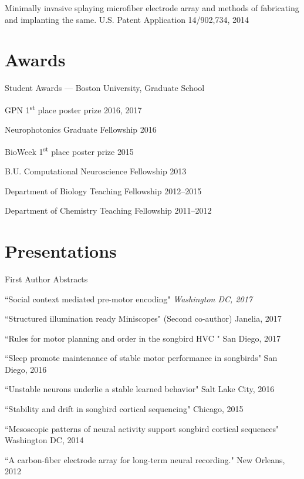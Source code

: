 Minimally invasive splaying microfiber electrode array and methods of fabricating and implanting the same.  U.S. Patent Application 14/902,734, 2014

\section{Awards}
Student Awards --- Boston University, Graduate School
\begin{innerlist}
\item GPN 1\textsuperscript{st} place poster prize \hfill{2016, 2017}
\item Neurophotonics Graduate Fellowship \hfill{2016}
\item BioWeek 1\textsuperscript{st} place poster prize \hfill{2015}
\item B.U. Computational Neuroscience Fellowship \hfill{2013}
\item Department of Biology Teaching Fellowship \hfill{2012--2015}
\item Department of Chemistry Teaching Fellowship \hfill{2011--2012}
\end{innerlist}

\section{Presentations}
First Author Abstracts
\begin{innerlist}
\item ``Social context mediated pre-motor encoding" \hfill \emph{\color{Maroon} Washington DC, 2017}
\item ``Structured illumination ready Miniscopes" (Second co-author) \hfill {Janelia, 2017}
\item ``Rules for motor planning and order in the songbird HVC " \hfill {San Diego, 2017}
\item ``Sleep promote maintenance of stable motor performance in songbirds" \hfill {San Diego, 2016}
\item ``Unstable neurons underlie a stable learned behavior" \hfill Salt Lake City, 2016
\item ``Stability and drift in songbird cortical sequencing" \hfill Chicago, 2015
\item ``Mesoscopic patterns of neural activity support songbird cortical sequences"  \hfill  Washington DC, 2014
\item ``A carbon-fiber electrode array for long-term neural recording."  \hfill New Orleans, 2012
\end{innerlist}

